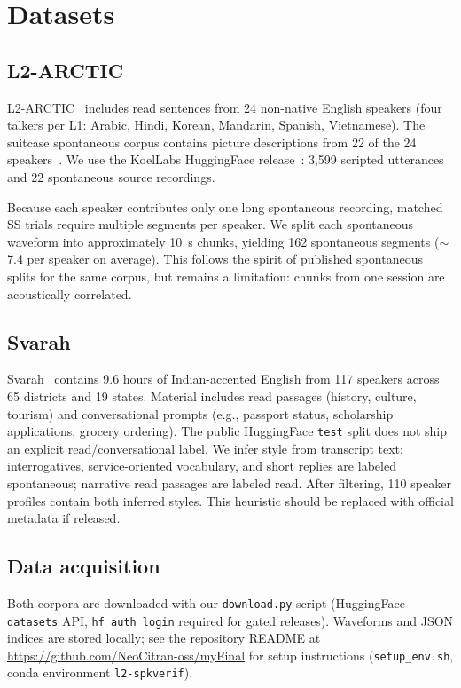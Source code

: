 \documentclass[cameraready]{Interspeech}
\begin{document}
\section{Datasets}
\label{sec:datasets}

\subsection{L2-ARCTIC}

L2-ARCTIC~\cite{zhao2018l2arctic} includes read sentences from 24 non-native English speakers (four talkers per L1: Arabic, Hindi, Korean, Mandarin, Spanish, Vietnamese). The suitcase spontaneous corpus contains picture descriptions from 22 of the 24 speakers~\cite{zhao2018l2arctic}. We use the KoelLabs HuggingFace release~\cite{koellabs2024l2arctic}: 3{,}599 scripted utterances and 22 spontaneous source recordings.

Because each speaker contributes only one long spontaneous recording, matched SS trials require multiple segments per speaker. We split each spontaneous waveform into approximately \SI{10}{\second} chunks, yielding 162 spontaneous segments ($\sim$7.4 per speaker on average). This follows the spirit of published spontaneous splits for the same corpus, but remains a limitation: chunks from one session are acoustically correlated.

\subsection{Svarah}

Svarah~\cite{javed2023svarah} contains 9.6 hours of Indian-accented English from 117 speakers across 65 districts and 19 states. Material includes read passages (history, culture, tourism) and conversational prompts (e.g., passport status, scholarship applications, grocery ordering). The public HuggingFace \texttt{test} split does not ship an explicit read/conversational label. We infer style from transcript text: interrogatives, service-oriented vocabulary, and short replies are labeled spontaneous; narrative read passages are labeled read. After filtering, 110 speaker profiles contain both inferred styles. This heuristic should be replaced with official metadata if released.

\subsection{Data acquisition}

Both corpora are downloaded with our \texttt{download.py} script (HuggingFace \texttt{datasets} API, \texttt{hf auth login} required for gated releases). Waveforms and JSON indices are stored locally; see the repository README at \url{https://github.com/NeoCitran-oss/myFinal} for setup instructions (\texttt{setup\_env.sh}, conda environment \texttt{l2-spkverif}).
\end{document}

